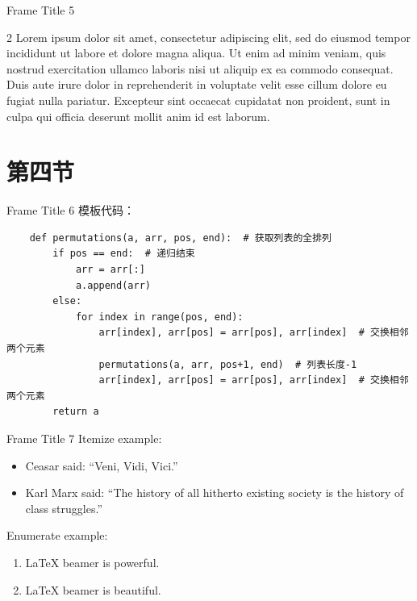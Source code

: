 \documentclass{beamer}
\begin{document}
\begin{frame}{Frame Title 5}
    \begin{multicols}{2}
    Lorem ipsum dolor sit amet, consectetur adipiscing elit, sed do eiusmod tempor incididunt ut labore et dolore magna aliqua. Ut enim ad minim veniam, quis nostrud exercitation ullamco laboris nisi ut aliquip ex ea commodo consequat. Duis aute irure dolor in reprehenderit in voluptate velit esse cillum dolore eu fugiat nulla pariatur. Excepteur sint occaecat cupidatat non proident, sunt in culpa qui officia deserunt mollit anim id est laborum.
    \end{multicols}
\end{frame}

\section{第四节}

\begin{frame}[fragile]{Frame Title 6}
    模板代码：
    \begin{lstlisting}
    def permutations(a, arr, pos, end):  # 获取列表的全排列
        if pos == end:  # 递归结束
            arr = arr[:]
            a.append(arr)
        else:
            for index in range(pos, end):
                arr[index], arr[pos] = arr[pos], arr[index]  # 交换相邻两个元素
                permutations(a, arr, pos+1, end)  # 列表长度-1
                arr[index], arr[pos] = arr[pos], arr[index]  # 交换相邻两个元素
        return a
    \end{lstlisting}
\end{frame}

\begin{frame}{Frame Title 7}
    Itemize example: \pause
    \begin{itemize}
        \item Ceasar said: “Veni, Vidi, Vici.” \pause
        \item Karl Marx said: “The history of all hitherto existing society is the history of class struggles.” \pause
    \end{itemize}
    Enumerate example: \pause
    \begin{enumerate}
        \item \LaTeX{} beamer is powerful. \pause
        \item \LaTeX{} beamer is beautiful. \pause
    \end{enumerate}
\end{frame}
\end{document}
